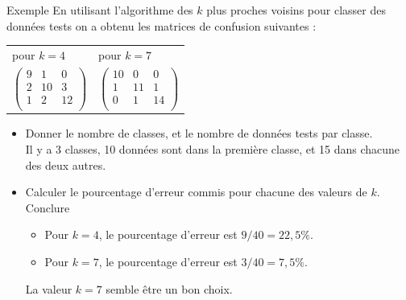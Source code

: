 \documentclass[10pt]{beamer}
\begin{document}
\begin{frame}{\Ctitle}{\stitle}
    \begin{exampleblock}{Exemple}
        En utilisant l'algorithme des $k$ plus proches voisins pour classer des données tests on a obtenu les matrices de confusion suivantes : 
        \begin{center}
        \begin{tabularx}{\textwidth}{Y|Y}
            pour $k=4$ & pour $k=7$  \\
            $\begin{pmatrix}
                9 & 1 & 0 \\
                2 & 10 & 3 \\
                1 & 2  & 12 \\
            \end{pmatrix}$  & 
            $\begin{pmatrix}
                10 & 0 & 0 \\
                1 & 11 & 1 \\
                0 & 1  & 14 \\
            \end{pmatrix}$ \\
        \end{tabularx}
        \begin{itemize}
            \item<2-> Donner le nombre de classes, et le nombre de données tests par classe.\\
            \textcolor{OliveGreen}{Il y a 3 classes, 10 données sont dans la première classe, et 15 dans chacune des deux autres.}
            \item<5-> Calculer le pourcentage d'erreur commis pour chacune des valeurs de $k$. Conclure \\
                \begin{itemize}
                    \item<7->\textcolor{OliveGreen}{Pour $k=4$, le pourcentage d'erreur est $9/40 = 22,5 \%$.}
                    \item<8->\textcolor{OliveGreen}{Pour $k=7$, le pourcentage d'erreur est $3/40 = 7,5 \%$.}
                \end{itemize}
            \textcolor{OliveGreen}{La valeur $k=7$ semble être un bon choix.}
        \end{itemize}
    \end{center}

    \end{exampleblock}
\end{frame}
\end{document}
